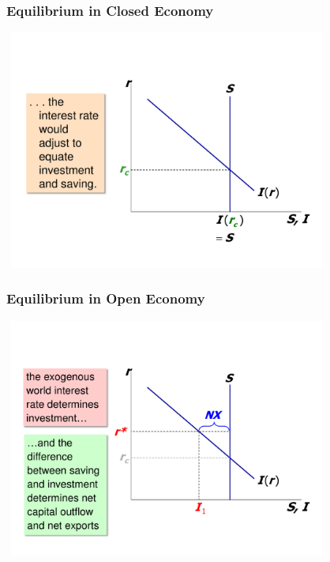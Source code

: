 \documentclass[handout]{beamer}
\begin{document}
\begin{frame}[t]
\frametitle{Equilibrium in Closed Economy}
\begin{center}
\includegraphics[height=3.1in,width=4.25in]{ch6_investment_curve_2.pdf}
\end{center}
\end{frame}


\begin{frame}[t]
\frametitle{Equilibrium in Open Economy}
\begin{center}
\includegraphics[height=3.1in,width=4.25in]{ch6_investment_curve_3.pdf}
\end{center}
\end{frame}

\end{document}
